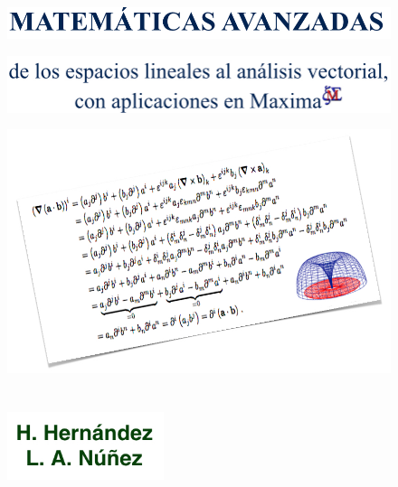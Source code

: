 \vspace{2cm}

\begin{figure}
\centering
\includegraphics[width=1.0\textwidth]{VOLUMEN_1/00_Portada/letras1}
\end{figure}

\begin{figure}
\centering
\includegraphics[width=1.0\textwidth]{VOLUMEN_1/00_Portada/letras2}
\end{figure}

\begin{figure}
\centering
\vspace{0.5cm}
\includegraphics[width=1.0\textwidth]{VOLUMEN_1/00_Portada/figura}
\end{figure}

\begin{figure}[ht]
\begin{minipage}{16.0cm}
\end{minipage} \hfill 
\begin{minipage}{4.0cm} 
\vspace{0.8cm}
\includegraphics[height=1.3in,width=1.8in]{VOLUMEN_1/00_Portada/letras3}
\end{minipage}
\end{figure}






